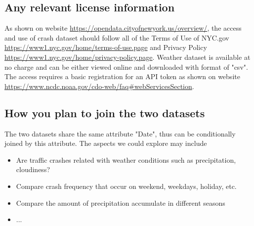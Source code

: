 \documentclass{article}
\begin{document}
\subsection{ Any relevant license information}
As shown on website \url{https://opendata.cityofnewyork.us/overview/}, the access and use of crash dataset should follow all of the Terms of Use of NYC.gov \url{https://www1.nyc.gov/home/terms-of-use.page} and Privacy Policy \url{https://www1.nyc.gov/home/privacy-policy.page}. 
\noindent Weather dataset is available at no charge and can be either viewed online and downloaded with format of "csv". The access requires a basic registration for an API token as shown on website \url{https://www.ncdc.noaa.gov/cdo-web/faq#webServicesSection}.

\subsection{ How you plan to join the two datasets }
The two datasets share the same attribute "Date", thus can be conditionally joined by this attribute. The aspects we could explore may include
\begin{itemize}
	\item Are traffic crashes related with weather conditions such as precipitation, cloudiness?
	\item Compare crash frequency that occur on weekend, weekdays, holiday, etc.
	\item Compare the amount of precipitation accumulate in different seasons 
	\item ...
\end{itemize}
\end{document}

